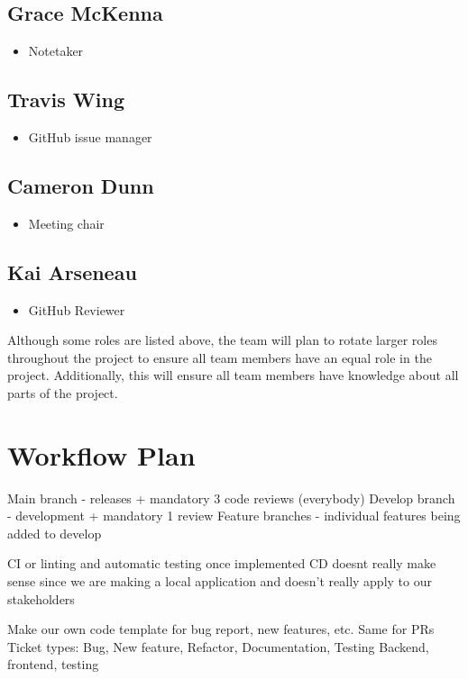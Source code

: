 \documentclass{article}
\begin{document}
\subsection*{Grace McKenna}
\begin{itemize}
	\item Notetaker
\end{itemize}

\subsection*{Travis Wing}
\begin{itemize}
	\item GitHub issue manager
\end{itemize}

\subsection*{Cameron Dunn}
\begin{itemize}
	\item Meeting chair
\end{itemize}

\subsection*{Kai Arseneau}
\begin{itemize}
	\item GitHub Reviewer
\end{itemize}

\noindent Although some roles are listed above, the team will plan to rotate larger roles throughout the project to ensure all team members have an equal role in the project.
Additionally, this will ensure all team members have knowledge about all parts of the project. 


\section{Workflow Plan}
Main branch - releases + mandatory 3 code reviews (everybody)
Develop branch - development + mandatory 1 review
Feature branches - individual features being added to develop

CI or linting and automatic testing once implemented
CD doesnt really make sense since we are making a local application and doesn't really apply to our stakeholders

Make our own code template for bug report, new features, etc. Same for PRs 
Ticket types: Bug, New feature, Refactor, Documentation, Testing
Backend, frontend, testing
\end{document}
